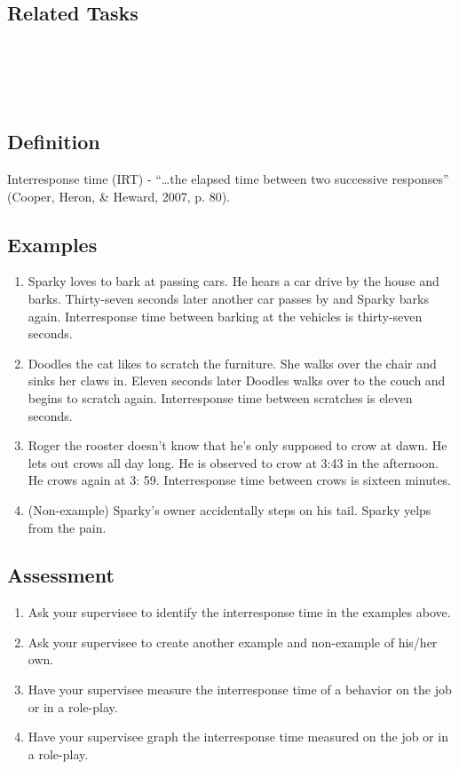 \subsection{Related Tasks}
\fourhOne{}\\
\fouriOne{}\\
\fourFKFourtySeven{}\\
%
%
%
%
%
%
%
%
\section{\fouraFive{}}
\subsection{Definition}  
Interresponse time (IRT) - ``…the elapsed time between two successive responses'' (Cooper, Heron, \& Heward, 2007, p. 80).
%  
\subsection{Examples} 
\begin{enumerate}
\item Sparky loves to bark at passing cars.  He hears a car drive by the house and barks.  Thirty-seven seconds later another car passes by and Sparky barks again.  Interresponse time between barking at the vehicles is thirty-seven seconds.
\item Doodles the cat likes to scratch the furniture.  She walks over the chair and sinks her claws in.  Eleven seconds later Doodles walks over to the couch and begins to scratch again.  Interresponse time between scratches is eleven seconds.  
\item Roger the rooster doesn't know that he's only supposed to crow at dawn. He lets out crows all day long.  He is observed to crow at 3:43 in the afternoon.  He crows again at 3: 59.  Interresponse time between crows is sixteen minutes.  
\item (Non-example) Sparky's owner accidentally steps on his tail.  Sparky yelps from the pain. 
\end{enumerate}
%
\subsection{Assessment}
\begin{enumerate}
\item Ask your supervisee to identify the interresponse time in the examples above. 
\item Ask your supervisee to create another example and non-example of his/her own. 
\item Have your supervisee measure the interresponse time of a behavior on the job or in a role-play. 
\item Have your supervisee graph the interresponse time measured on the job or in a role-play.
\end{enumerate}
%
